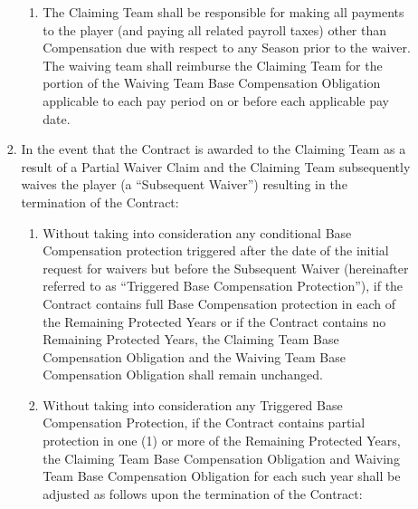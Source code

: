 \documentclass[
]{book}
\providecommand{\tightlist}{%
  \setlength{\itemsep}{0pt}\setlength{\parskip}{0pt}}
\begin{document}
\begin{enumerate}
\begin{enumerate}
\begin{enumerate}
\begin{enumerate}
      \item
        The Claiming Team shall be responsible for making all payments to the player (and paying all related payroll taxes) other than Compensation due with respect to any Season prior to the waiver. The waiving team shall reimburse the Claiming Team for the portion of the Waiving Team Base Compensation Obligation applicable to each pay period on or before each applicable pay date.
      \end{enumerate}
    \item
      In the event that the Contract is awarded to the Claiming Team as a result of a Partial Waiver Claim and the Claiming Team subsequently waives the player (a ``Subsequent Waiver'') resulting in the termination of the Contract:

      \begin{enumerate}
      \def\labelenumiv{(\Alph{enumiv})}
      \tightlist
      \item
        Without taking into consideration any conditional Base Compensation protection triggered after the date of the initial request for waivers but before the Subsequent Waiver (hereinafter referred to as ``Triggered Base Compensation Protection''), if the Contract contains full Base Compensation protection in each of the Remaining Protected Years or if the Contract contains no Remaining Protected Years, the Claiming Team Base Compensation Obligation and the Waiving Team Base Compensation Obligation shall remain unchanged.
      \item
        Without taking into consideration any Triggered Base Compensation Protection, if the Contract contains partial protection in one (1) or more of the Remaining Protected Years, the Claiming Team Base Compensation Obligation and Waiving Team Base Compensation Obligation for each such year shall be adjusted as follows upon the termination of the Contract:


\end{enumerate}
\end{enumerate}
\end{enumerate}
\end{enumerate}
\end{document}
